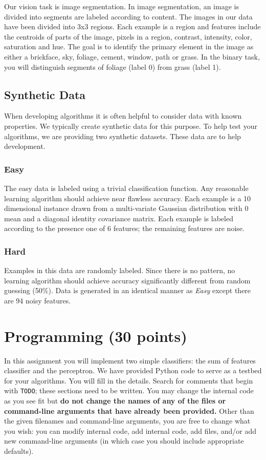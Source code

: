 \documentclass[11pt]{article}
\begin{document}
	Our vision task is image segmentation. In image segmentation, an image is divided into segments are labeled according to content. The images in our data have been divided into 3x3 regions. Each example is a region and features include the centroids of parts of the image, pixels in a region, contrast, intensity, color, saturation and hue. The goal is to identify the primary element in the image as either a brickface, sky, foliage, cement, window, path or grass. In the binary task, you will distinguish segments of foliage (label 0) from grass (label 1).
	
	\subsection{Synthetic Data}
	When developing algorithms it is often helpful to consider data with known properties. We typically create synthetic data for this purpose. To help test your algorithms, we are providing two synthetic datasets. These data are to help development.
	
	\subsubsection{Easy}
	The easy data is labeled using a trivial classification function. Any reasonable learning algorithm should achieve near flawless accuracy. Each example is a 10 dimensional instance drawn from a multi-variate Gaussian distribution with 0 mean and a diagonal identity covariance matrix. Each example is labeled according to the presence one of 6 features; the remaining features are noise.
	
	\subsubsection{Hard}
	Examples in this data are randomly labeled. Since there is no pattern, no learning algorithm should achieve accuracy significantly different from random guessing (50\%). Data is generated in an identical manner as \emph{Easy} except there are 94 noisy features.
	
	\section{Programming (30 points)}
	In this assignment you will implement two simple classifiers: the sum of features classifier and the perceptron. We have provided Python code to serve as a testbed for your algorithms. You will fill in the details. Search for comments that begin with {\tt TODO}; these sections need to be written. You may change the internal code as you see fit but \textbf{do not change the names of any of the files or command-line arguments that have already been provided.} Other than the given filenames and command-line arguments, you are free to change what you wish: you can modify internal code, add internal code, add files, and/or add new command-line arguments (in which case you should include appropriate defaults).
	
\end{document}

